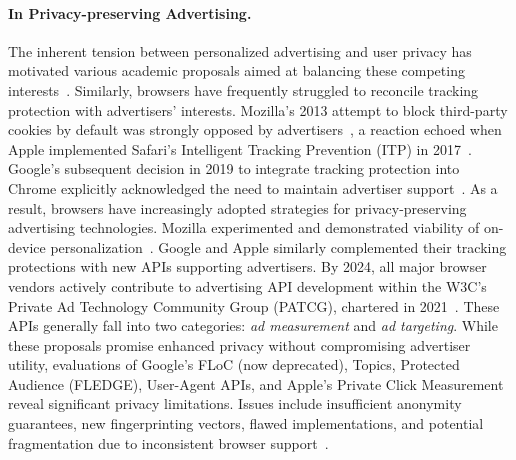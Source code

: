 \paragraph{In Privacy-preserving Advertising.}
%
The inherent tension between personalized advertising and user privacy has motivated various academic proposals aimed at balancing these competing interests~\cite{toubianaAdnosticPrivacyPreserving2010,guhaPrivadPracticalPrivacy2011,backesObliviAdProvablySecure2012}. Similarly, browsers have frequently struggled to reconcile tracking protection with advertisers' interests. Mozilla’s 2013 attempt to block third-party cookies by default was strongly opposed by advertisers~\cite{ribeiroMozillaPostponesDefault2013}, a reaction echoed when Apple implemented Safari's Intelligent Tracking Prevention (ITP) in 2017~\cite{stattAdvertisersAreFurious2017}. Google's subsequent decision in 2019 to integrate tracking protection into Chrome explicitly acknowledged the need to maintain advertiser support~\cite{schuhBuildingMorePrivate2019,chromeBuildingMorePrivate2020}.
%
As a result, browsers have increasingly adopted strategies for privacy-preserving advertising technologies. Mozilla experimented and demonstrated viability of on-device personalization~\cite{mozillaProvidingValuablePlatform2015}. Google and Apple similarly complemented their tracking protections with new APIs supporting advertisers. By 2024, all major browser vendors actively contribute to advertising API development within the W3C’s Private Ad Technology Community Group (PATCG), chartered in 2021~\cite{hercherW3CAdPrivacy2022}. These APIs generally fall into two categories: \textit{ad measurement} and \textit{ad targeting}.
While these proposals promise enhanced privacy without compromising advertiser utility, evaluations of Google's FLoC (now deprecated)\cite{rescorlaTechnicalCommentsFLoC2021,berkePrivacyLimitationsInterestbased2022,turatiLocalitySensitiveHashingDoes2023}, Topics\cite{thomsonPrivacyAnalysisGoogles2023,jhaRobustnessTopicsAPI2023,beuginInterestdisclosingMechanismsAdvertising2024,beuginPublicReproducibleAssessment2024,alvimPrivacyUtilityTradeoffTopics2024}, Protected Audience (FLEDGE)\cite{thomsonProtectedAudiencePrivacy2024,longEvaluatingGooglesProtected2024,calderonioFledgingWillContinue2024}, User-Agent APIs\cite{senolUnveilingImpactUserAgent2023,intumwayaseUARadarExploringImpact2023}, and Apple's Private Click Measurement~\cite{thomsonAnalysisApplesPrivate2022} reveal significant privacy limitations. Issues include insufficient anonymity guarantees, new fingerprinting vectors, flawed implementations, and potential fragmentation due to inconsistent browser support~\cite{munirGooglesChromeAntitrust2024}.


